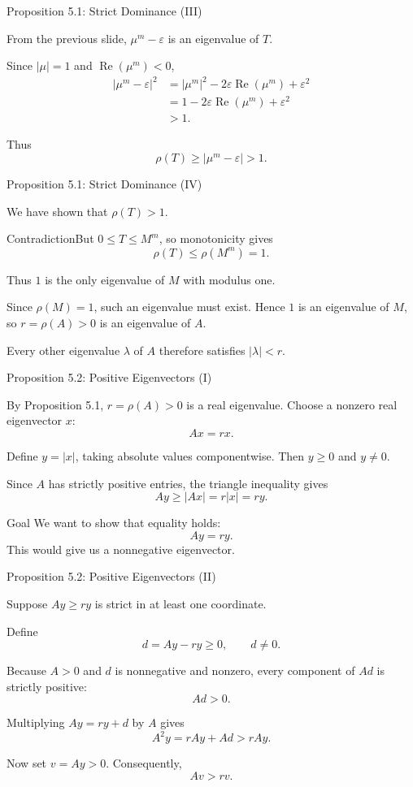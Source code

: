 \documentclass{beamer}
\begin{document}
\begin{frame}{Proposition 5.1: Strict Dominance (III)}
\small

From the previous slide,
$\mu^m-\varepsilon$ is an eigenvalue of $T$.

Since $|\mu|=1$ and
$\operatorname{Re}(\mu^m)<0$,
\[
\begin{aligned}
|\mu^m-\varepsilon|^2
&=|\mu^m|^2
  -2\varepsilon\operatorname{Re}(\mu^m)
  +\varepsilon^2\\
&=1-2\varepsilon\operatorname{Re}(\mu^m)
  +\varepsilon^2\\
&>1.
\end{aligned}
\]

Thus
\[
\rho(T)\geq|\mu^m-\varepsilon|>1.
\]
\end{frame}

\begin{frame}{Proposition 5.1: Strict Dominance (IV)}
\small

We have shown that $\rho(T)>1$.

\begin{block}{Contradiction}But $0\leq T\leq M^m$, so monotonicity gives
\[
\rho(T)\leq\rho(M^m)=1.
\]
\end{block}


Thus $1$ is the only eigenvalue of $M$
with modulus one.

Since $\rho(M)=1$, such an eigenvalue
must exist. Hence $1$ is an eigenvalue
of $M$, so $r=\rho(A)>0$ is an eigenvalue
of $A$.

Every other eigenvalue $\lambda$ of $A$
therefore satisfies $|\lambda|<r$.
\end{frame}

\begin{frame}{Proposition 5.2: Positive Eigenvectors (I)}
\small

By Proposition 5.1, $r=\rho(A)>0$ is a real
eigenvalue. Choose a nonzero real eigenvector $x$:
\[
Ax=rx.
\]

Define $y=|x|$, taking absolute values
componentwise. Then $y\geq 0$ and $y\neq 0$.

Since $A$ has strictly positive entries,
the triangle inequality gives
\[
Ay\geq |Ax|=r|x|=ry.
\]

\begin{block}{Goal}
We want to show that equality holds:
\[
Ay=ry.
\]
This would give us a nonnegative eigenvector.
\end{block}
\end{frame}

\begin{frame}{Proposition 5.2: Positive Eigenvectors (II)}
\small

Suppose $Ay\geq ry$ is strict in at least
one coordinate.

Define
\[
d=Ay-ry\geq0,\qquad d\neq0.
\]

Because $A>0$ and $d$ is nonnegative
and nonzero, every component of $Ad$
is strictly positive:
\[
Ad>0.
\]

Multiplying $Ay=ry+d$ by $A$ gives
\[
A^2y=rAy+Ad>rAy.
\]

Now set $v=Ay>0$. Consequently,
\[
\boxed{Av>rv.}
\]
\end{frame}
\end{document}
